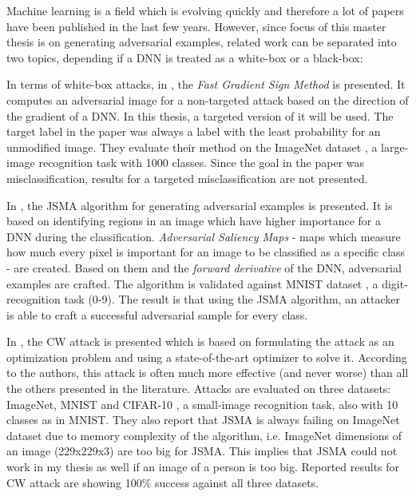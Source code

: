 Machine learning is a field which is evolving quickly and therefore a lot of papers have been published in the last few years. However, since focus of this master thesis is on generating adversarial examples, related work can be separated into two topics, depending if a DNN is treated as a white-box or a black-box:

In terms of white-box attacks, in \cite{fgsm-original}, the \textit{Fast Gradient Sign Method} is presented. It computes an adversarial image for a non-targeted attack based on the direction of the gradient of a DNN. In this thesis, a targeted version \cite{fgsm-targeted} of it will be used. The target label in the paper was always a label with the least probability for an unmodified image. They evaluate their method on the ImageNet dataset \cite{datasetImageNet}, a large-image recognition task with 1000 classes. Since the goal in the paper was misclassification, results for a targeted misclassification are not presented. 

In \cite{DBLP:journals/corr/PapernotMJFCS15}, the JSMA algorithm for generating adversarial examples is presented. It is based on identifying regions in an image which have higher importance for a DNN during the classification. \textit{Adversarial Saliency Maps} - maps which measure how much every pixel is important for an image to be classified as a specific class - are created. Based on them and the \textit{forward derivative} of the DNN, adversarial examples are crafted. The algorithm is validated against MNIST dataset \cite{datasetMNIST}, a digit-recognition task (0-9). The result is that using the JSMA algorithm, an attacker is able to craft a successful adversarial sample for every class.

In \cite{DBLP:journals/corr/CarliniW16a}, the CW attack is presented which is based on formulating the attack as an optimization problem and using a state-of-the-art optimizer to solve it. According to the authors, this attack is often much more effective (and never worse) than all the others presented in the literature. 
Attacks are evaluated on three datasets: ImageNet, MNIST and CIFAR-10 \cite{datasetCIFAR10}, a small-image recognition task, also with 10 classes as in MNIST. They also report that JSMA is always failing on ImageNet dataset due to memory complexity of the algorithm, i.e. ImageNet dimensions of an image (229x229x3) are too big for JSMA. This implies that JSMA could not work in my thesis as well if an image of a person is too big. Reported results for CW attack are showing 100\% success against all three datasets.

